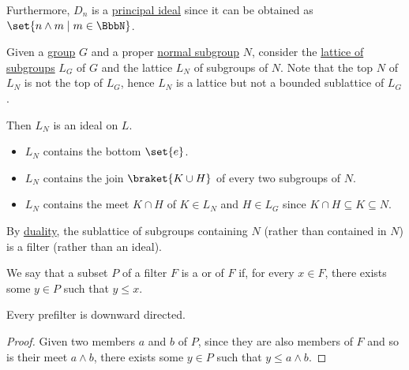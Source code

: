 \begin{example}
\begin{thmenum}
    Furthermore, \( D_n \) is a \hyperref[def:semiring_ideal]{principal ideal} since it can be obtained as \( \set{ n \wedge m \mid m \in \BbbN } \).

     Given a \hyperref[def:group]{group} \( G \) and a proper \hyperref[thm:normal_subgroup_equivalences]{normal subgroup} \( N \), consider the \hyperref[thm:substructures_form_complete_lattice]{lattice of subgroups} \( L_G \) of \( G \) and the lattice \( L_N \) of subgroups of \( N \). Note that the top \( N \) of \( L_N \) is not the top of \( L_G \), hence \( L_N \) is a lattice but not a bounded sublattice of \( L_G \).

    Then \( L_N \) is an ideal on \( L \).
    \begin{itemize}
      \item \( L_N \) contains the bottom \( \set{ e } \).
      \item \( L_N \) contains the join \( \braket{ K \cup H } \) of every two subgroups of \( N \).
      \item \( L_N \) contains the meet \( K \cap H \) of \( K \in L_N \) and \( H \in L_G \) since \( K \cap H \subseteq K \subseteq N \).
    \end{itemize}

    By \hyperref[def:semilattice/duality]{duality}, the sublattice of subgroups containing \( N \) (rather than contained in \( N \)) is a filter (rather than an ideal).
  \end{thmenum}
\end{example}

\begin{definition}\label{def:prefilter}
  We say that a subset \( P \) of a filter \( F \) is a  or  of \( F \) if, for every \( x \in F \), there exists some \( y \in P \) such that \( y \leq x \).
\end{definition}

\begin{proposition}\label{thm:prefilter_can_generate_filter}
  Every prefilter is downward directed.
\end{proposition}
\begin{proof}
  Given two members \( a \) and \( b \) of \( P \), since they are also members of \( F \) and so is their meet \( a \wedge b \), there exists some \( y \in P \) such that \( y \leq a \wedge b \).
\end{proof}

